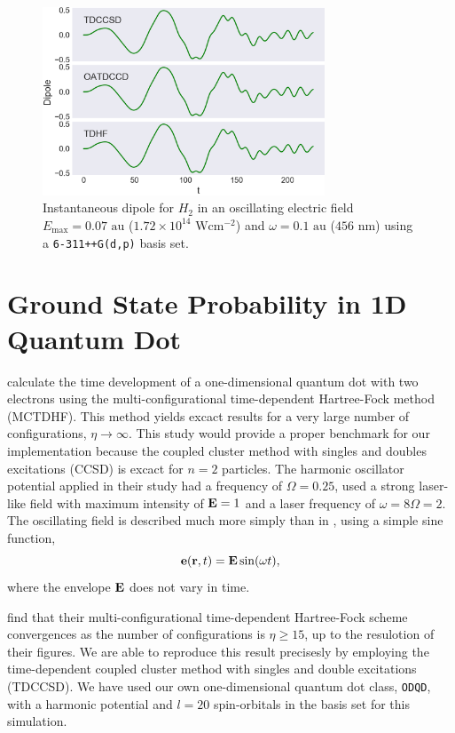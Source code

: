 \begin{figure}
    \centering
    \includegraphics[width=0.75\textwidth]{results/figures/li_compare.png}
    \caption{Instantaneous dipole for $H_2$ in an oscillating electric field
        $E_\text{max} = 0.07 \text{ au}$ ($1.72\times10^14 \text{ W} \text{cm}^{-2}$)
        and $\omega=0.1 \text{ au}$ ($456\text{ nm}$) using a \lstinline{6-311++G(d,p)}
        basis set.
    }
    \label{fig:li_compare}
\end{figure}


\section{Ground State Probability in 1D Quantum Dot}

\citeauthor{Zanghellini04}\cite{Zanghellini04} calculate the time development of a 
one-dimensional quantum dot with two electrons using the multi-configurational 
time-dependent Hartree-Fock method (MCTDHF). This method yields excact results for 
a very large number of configurations, $\eta \to \infty$. This study would provide a 
proper benchmark for our implementation because the coupled cluster method with singles and 
doubles excitations (CCSD) is excact for $n=2$ particles. 
The harmonic oscillator potential applied in
their study had a frequency of $\Omega=0.25$, used a strong laser-like field with 
maximum intensity of $\vb{E} = 1$ and a laser frequency of $\omega = 8 \Omega = 2$.
The oscillating field is described much more simply than in
\citeauthor{li2005time}\cite{li2005time}, using a simple sine function,
\begin{equation}
    \vb{e}(\vb{r}, t) = \vb{E}\sin(\omega t),
\end{equation}
where the envelope $\vb{E}$ does not vary in time.

\citeauthor{Zanghellini04}\cite{Zanghellini04} find that their multi-configurational time-dependent
Hartree-Fock scheme convergences as the number of configurations is 
$\eta \geq15$, up to the resulotion of their figures.
We are able to reproduce this result precisesly by employing the 
time-dependent coupled cluster method with singles and double excitations (TDCCSD).
We have used our own one-dimensional quantum dot class, \lstinline{ODQD}, with 
a harmonic potential and $l=20$ spin-orbitals
in the basis set for this simulation.

